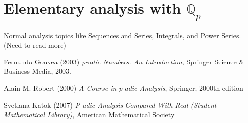 \documentclass[12pt]{article}
\newcommand{\qq}{\mathbb Q}   %
\begin{document}
\section{Elementary analysis with $\qq_p$}
Normal analysis topics like Sequences and Series, Integrals, and Power Series. (Need to read more)
\newpage
\begin{thebibliography}{9}
    Fernando Gouvea (2003) \emph{p-adic Numbers: An Introduction}, Springer Science \& Business Media, 2003.
    
    Alain M. Robert (2000) \emph{A Course in p-adic Analysis}, Springer; 2000th edition

    Svetlana Katok (2007) \emph{P-adic Analysis Compared With Real (Student Mathematical Library)}, American Mathematical Society
    \end{thebibliography}
\end{document}

